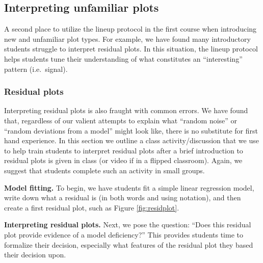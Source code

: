 \documentclass[12pt]{article}
\begin{document}
\hypertarget{interpreting-unfamiliar-plots}{%
\subsection{Interpreting unfamiliar
plots}\label{interpreting-unfamiliar-plots}}

A second place to utilize the lineup protocol in the first course when
introducing new and unfamiliar plot types. For example, we have found
many introductory students struggle to interpret residual plots. In this
situation, the lineup protocol helps students tune their understanding
of what constitutes an ``interesting'' pattern (i.e.~signal).

\hypertarget{residual-plots}{%
\subsubsection{Residual plots}\label{residual-plots}}

Interpreting residual plots is also fraught with common errors. We have
found that, regardless of our valient attempts to explain what ``random
noise'' or ``random deviations from a model'' might look like, there is
no substitute for first hand experience. In this section we outline a
class activity/discussion that we use to help train students to
interpret residual plots after a brief introduction to residual plots is
given in class (or video if in a flipped classroom). Again, we suggest
that students complete such an activity in small groups.

\textbf{Model fitting.} To begin, we have students fit a simple linear
regression model, write down what a residual is (in both words and using
notation), and then create a first residual plot, such as Figure
\ref{fig:residplot}.

\textbf{Interpreting residual plots.} Next, we pose the question: ``Does
this residual plot provide evidence of a model deficiency?'' This
provides students time to formalize their decision, especially what
features of the residual plot they based their decision upon.
\end{document}
